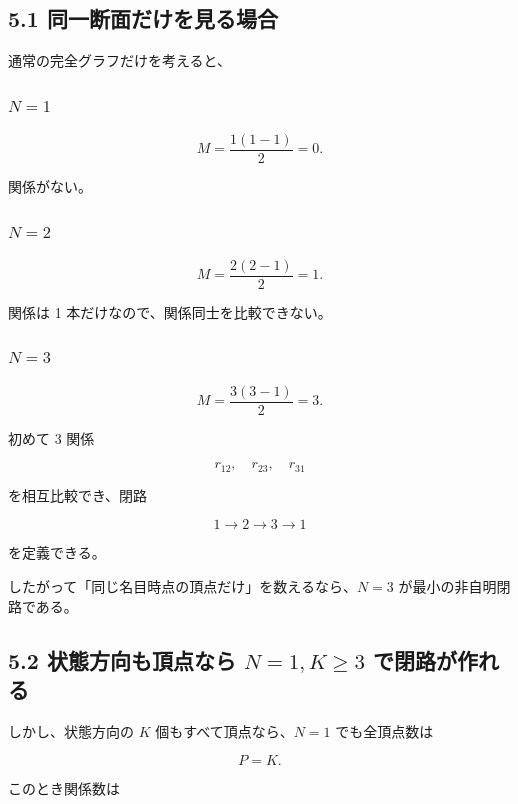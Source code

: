 \documentclass[
  a4paper,
]{ltjsarticle}
\begin{document}
\subsection{5.1
同一断面だけを見る場合}\label{ux540cux4e00ux65adux9762ux3060ux3051ux3092ux898bux308bux5834ux5408}

通常の完全グラフだけを考えると、

\subsubsection{\texorpdfstring{\(N=1\)}{N=1}}\label{n1}

\[
M
=
\frac{1(1-1)}{2}
=0.
\]

関係がない。

\subsubsection{\texorpdfstring{\(N=2\)}{N=2}}\label{n2}

\[
M
=
\frac{2(2-1)}{2}
=1.
\]

関係は 1 本だけなので、関係同士を比較できない。

\subsubsection{\texorpdfstring{\(N=3\)}{N=3}}\label{n3}

\[
M
=
\frac{3(3-1)}{2}
=3.
\]

初めて 3 関係

\[
r_{12},\quad r_{23},\quad r_{31}
\]

を相互比較でき、閉路

\[
1\to2\to3\to1
\]

を定義できる。

したがって「同じ名目時点の頂点だけ」を数えるなら、\(N=3\)
が最小の非自明閉路である。

\subsection{\texorpdfstring{5.2 状態方向も頂点なら \(N=1, K\ge3\)
で閉路が作れる}{5.2 状態方向も頂点なら N=1, K\textbackslash ge3 で閉路が作れる}}\label{ux72b6ux614bux65b9ux5411ux3082ux9802ux70b9ux306aux3089-n1-kge3-ux3067ux9589ux8defux304cux4f5cux308cux308b}

しかし、状態方向の \(K\) 個もすべて頂点なら、\(N=1\) でも全頂点数は

\[
P=K.
\]

このとき関係数は
\end{document}

